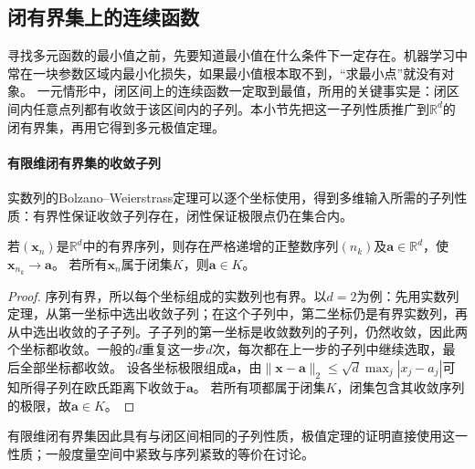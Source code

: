 \subsection{闭有界集上的连续函数}

寻找多元函数的最小值之前，先要知道最小值在什么条件下一定存在。机器学习中常在一块参数区域内最小化损失，如果最小值根本取不到，“求最小点”就没有对象。
一元情形中，闭区间上的连续函数一定取到最值，所用的关键事实是：闭区间内任意点列都有收敛于该区间内的子列。本小节先把这一子列性质推广到$\mathbb R^d$的闭有界集，再用它得到多元极值定理。

\paragraph{有限维闭有界集的收敛子列}
实数列的Bolzano--Weierstrass定理可以逐个坐标使用，得到多维输入所需的子列性质：有界性保证收敛子列存在，闭性保证极限点仍在集合内。
\begin{theorem}[有限维有界序列的收敛子列]
\label{thm:multivariable-bolzano-weierstrass}
若$(\bm x_n)$是$\mathbb R^d$中的有界序列，则存在严格递增的正整数序列$(n_k)$及$\bm a\in\mathbb R^d$，使$\bm x_{n_k}\to\bm a$。
若所有$\bm x_n$属于闭集$K$，则$\bm a\in K$。
\end{theorem}
\begin{proof}
序列有界，所以每个坐标组成的实数列也有界。以$d=2$为例：先用实数列定理，从第一坐标中选出收敛子列；在这个子列中，第二坐标仍是有界实数列，再从中选出收敛的子子列。子子列的第一坐标是收敛数列的子列，仍然收敛，因此两个坐标都收敛。一般的$d$重复这一步$d$次，每次都在上一步的子列中继续选取，最后全部坐标都收敛。
设各坐标极限组成$\bm a$，由$\lVert\bm x-\bm a\rVert_2\leq\sqrt d\max_j|x_j-a_j|$可知所得子列在欧氏距离下收敛于$\bm a$。
若所有项都属于闭集$K$，闭集包含其收敛序列的极限，故$\bm a\in K$。
\end{proof}
有限维闭有界集因此具有与闭区间相同的子列性质，极值定理的证明直接使用这一性质；一般度量空间中紧致与序列紧致的等价在讨论。

